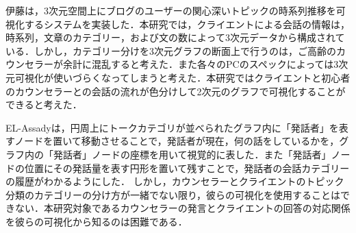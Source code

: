 \documentclass[shuuron]{kuee}
\begin{document}
伊藤\cite{itoh2010interactive}は，3次元空間上にブログのユーザーの関心深いトピックの時系列推移を可視化するシステムを実装した．本研究では，クライエントによる会話の情報は，時系列，文章のカテゴリー，および文の数によって3次元データから構成されている．しかし，カテゴリー分けを3次元グラフの断面上で行うのは，ご高齢のカウンセラーが余計に混乱すると考えた．また各々のPCのスペックによっては3次元可視化が使いづらくなってしまうと考えた．本研究ではクライエントと初心者のカウンセラーとの会話の流れが色分けして2次元のグラフで可視化することができると考えた．%

EL-Assady\cite{el2016contovi}は，円周上にトークカテゴリが並べられたグラフ内に「発話者」を表すノードを置いて移動させることで，発話者が現在，何の話をしているかを，グラフ内の「発話者」ノードの座標を用いて視覚的に表した．また「発話者」ノードの位置にその発話量を表す円形を置いて残すことで，発話者の会話カテゴリーの履歴がわかるようにした．
しかし，カウンセラーとクライエントのトピック分類のカテゴリーの分け方が一緒でない限り，彼らの可視化を使用することはできない．本研究対象であるカウンセラーの発言とクライエントの回答の対応関係を彼らの可視化から知るのは困難である．



%
\end{document}
